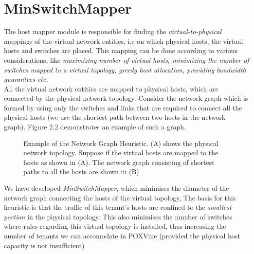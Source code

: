 \section{MinSwitchMapper}
The host mapper module is responsible for finding the \emph{virtual-to-physical} mappings of the virtual network entities, i.e on which physical hosts, the virtual hosts and switches are placed. This mapping can be done according to various considerations, like \emph{maximizing number of virtual hosts, minimizing the number of switches mapped to a virtual topology, greedy host allocation, providing bandwidth guarantees etc.} \\

All the virtual network entities are mapped to physical hosts, which are connected by the physical network topology. Consider the network graph which is formed by using only the switches and links that are required to connect all the physical hosts (we use the shortest path between two hosts in the network graph). Figure 2.2 demonstrates an example of such a graph. \\
\begin{figure}
	\noindent
	\caption{Example of the Network Graph Heuristic. (A) shows the physical network topology. Suppose if the virtual hosts are mapped to the hosts as shown in (A). The network graph consisting of shortest paths to all the hosts are shown in (B)}
\end{figure}

We have developed \emph{MinSwitchMapper}, which minimises the diameter of the network graph connecting the hosts of the virtual topology, The basis for this heuristic is that the traffic of this tenant's hosts are confined to the \emph{smallest portion} in the physical topology. This also minimises the number of switches where rules regarding this virtual topology is installed, thus increasing the number of tenants we can accomodate in POXVine (provided the physical host capacity is not insufficient)

